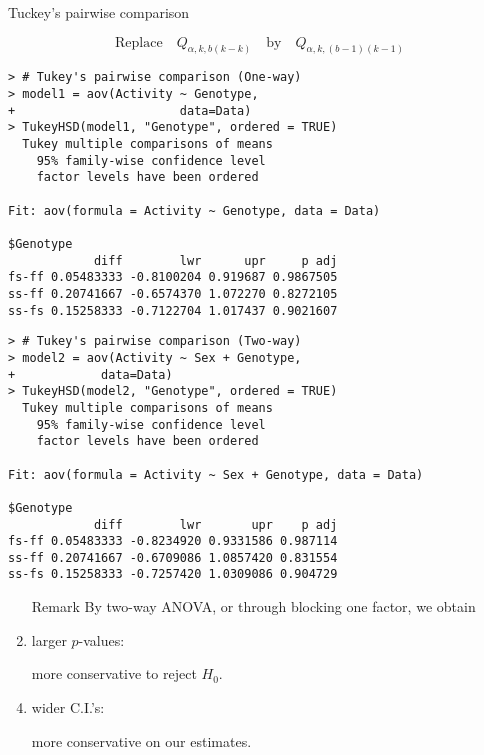 \begin{frame}[fragile]{Tuckey's pairwise comparison}

	\[
		\text{Replace} \quad Q_{\alpha, k,b(k-k)} \quad \text{by}\quad
		Q_{\alpha, k,(b-1)(k-1)}
	\]
	\vfill
	\begin{minipage}{0.47\textwidth}
	\begin{lstlisting}
> # Tukey's pairwise comparison (One-way)
> model1 = aov(Activity ~ Genotype,
+                       data=Data)
> TukeyHSD(model1, "Genotype", ordered = TRUE)
  Tukey multiple comparisons of means
    95% family-wise confidence level
    factor levels have been ordered

Fit: aov(formula = Activity ~ Genotype, data = Data)

$Genotype
            diff        lwr      upr     p adj
fs-ff 0.05483333 -0.8100204 0.919687 0.9867505
ss-ff 0.20741667 -0.6574370 1.072270 0.8272105
ss-fs 0.15258333 -0.7122704 1.017437 0.9021607
	\end{lstlisting}
	\end{minipage}
	\hfill
	\begin{minipage}{0.47\textwidth}
	\begin{lstlisting}
> # Tukey's pairwise comparison (Two-way)
> model2 = aov(Activity ~ Sex + Genotype,
+            data=Data)
> TukeyHSD(model2, "Genotype", ordered = TRUE)
  Tukey multiple comparisons of means
    95% family-wise confidence level
    factor levels have been ordered

Fit: aov(formula = Activity ~ Sex + Genotype, data = Data)

$Genotype
            diff        lwr       upr    p adj
fs-ff 0.05483333 -0.8234920 0.9331586 0.987114
ss-ff 0.20741667 -0.6709086 1.0857420 0.831554
ss-fs 0.15258333 -0.7257420 1.0309086 0.904729
	\end{lstlisting}
	\end{minipage}
\end{frame}
\begin{frame}[fragile]

	\begin{enumerate}
		\item[Remark] By two-way ANOVA, or through blocking one factor, we obtain
			\vfill
		\item larger $p$-values:
		\item[] more conservative to reject $H_0$.
			\vfill
		\item wider C.I.'s:
		\item[] more conservative on our estimates.
	\end{enumerate}
\end{frame}
